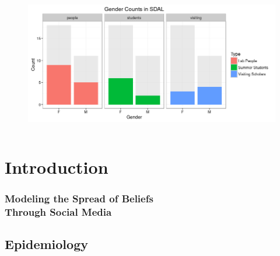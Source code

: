 \documentclass[compress]{beamer}
\begin{document}
\begin{frame}[Blank]
\begin{columns}
            \begin{column}{0.65\textwidth}
                \begin{figure}
                    \centering
                    \includegraphics[width=1.0\linewidth]{../figures/sdal_gender_breakdown}
                    \caption{}
                    \label{fig:sdalgenderbreakdown}
                    \end{figure}
            \end{column}
        \end{columns}
    \end{frame}

\section[Introduction]{Introduction}

    \begin{frame}[Section] \frametitle{\vspace{-0.2in}Modeling the Spread of Beliefs\\Through Social Media}
    \end{frame}

\subsection[Epidemiology]{Epidemiology}
\end{document}
